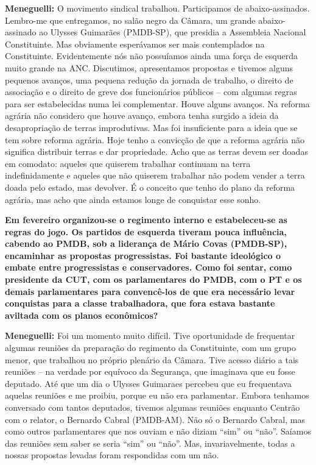 \textbf{Meneguelli:} O movimento sindical trabalhou. Participamos de
abaixo-assinados. Lembro-me que entregamos, no salão negro da Câmara, um
grande abaixo-assinado ao Ulysses Guimarães (PMDB-SP), que presidia a
Assembleia Nacional Constituinte. Mas obviamente esperávamos ser mais
contemplados na Constituinte. Evidentemente nós não possuíamos ainda uma
força de esquerda muito grande na ANC. Discutimos, apresentamos
propostas e tivemos alguns pequenos avanços, uma pequena redução da
jornada de trabalho, o direito de associação e o direito de greve dos
funcionários públicos -- com algumas regras para ser estabelecidas numa
lei complementar. Houve alguns avanços. Na reforma agrária não considero
que houve avanço, embora tenha surgido a ideia da desapropriação de
terras improdutivas. Mas foi insuficiente para a ideia que se tem sobre
reforma agrária. Hoje tenho a convicção de que a reforma agrária não
significa distribuir terras e dar propriedade. Acho que as terras devem
ser doadas em comodato: aqueles que quiserem trabalhar continuam na
terra indefinidamente e aqueles que não quiserem trabalhar não podem
vender a terra doada pelo estado, mas devolver. É o conceito que tenho
do plano da reforma agrária, mas acho que ainda estamos longe de
conquistar esse sonho.

\textbf{Em fevereiro organizou-se o regimento interno e estabeleceu-se
as regras do jogo. Os partidos de esquerda tiveram pouca influência,
cabendo ao PMDB, sob a liderança de Mário Covas (PMDB-SP), encaminhar as
propostas progressistas. Foi bastante ideológico o embate entre
progressistas e conservadores. Como foi sentar, como presidente da CUT,
com os parlamentares do PMDB, com o PT e os demais parlamentares para
convencê-los de que era necessário levar conquistas para a classe
trabalhadora, que fora estava bastante aviltada com os planos
econômicos?}

\textbf{Meneguelli:} Foi um momento muito difícil. Tive oportunidade de
frequentar algumas reuniões da preparação do regimento da Constituinte,
com um grupo menor, que trabalhou no próprio plenário da Câmara. Tive
acesso diário a tais reuniões -- na verdade por equívoco da Segurança,
que imaginava que eu fosse deputado. Até que um dia o Ulysses Guimaraes
percebeu que eu frequentava aquelas reuniões e me proibiu, porque eu não
era parlamentar. Embora tenhamos conversado com tantos deputados,
tivemos algumas reuniões enquanto Centrão com o relator, o Bernardo
Cabral (PMDB-AM). Não só o Bernardo Cabral, mas como outros
parlamentares que nos ouviam e não diziam ``sim'' ou ``não''. Saíamos
das reuniões sem saber se seria ``sim'' ou ``não''. Mas,
invariavelmente, todas a nossas propostas levadas foram respondidas com
um não.

